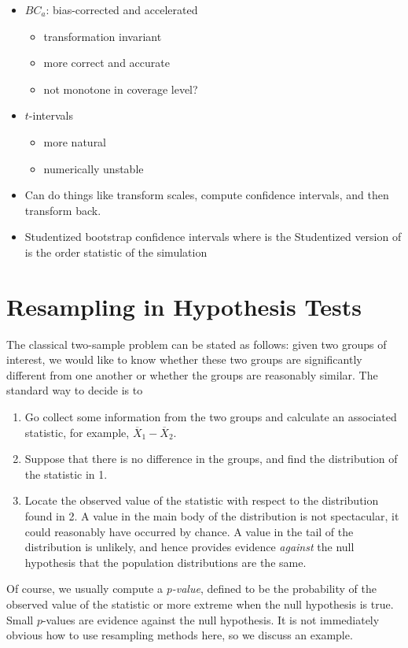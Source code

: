 \documentclass[captions=tableheading]{scrbook}
\begin{document}
\begin{itemize}
\item \(BC_{a}\): bias-corrected and accelerated
\begin{itemize}
\item transformation invariant
\item more correct and accurate
\item not monotone in coverage level?
\end{itemize}
\item \(t\)-intervals
\begin{itemize}
\item more natural
\item numerically unstable
\end{itemize}
\item Can do things like transform scales, compute confidence intervals, and then transform back.
\item Studentized bootstrap confidence intervals where is the Studentized version of is the  order statistic of the simulation
\end{itemize}
\section{Resampling in Hypothesis Tests}
\label{sec-13-4}
\label{sec-Resampling-in-Hypothesis}


The classical two-sample problem can be stated as follows: given two groups of interest, we would like to know whether these two groups are significantly different from one another or whether the groups are reasonably similar. The standard way to decide is to 
\begin{enumerate}
\item Go collect some information from the two groups and calculate an associated statistic, for example, \(\overline{X}_{1}-\overline{X}_{2}\).
\item Suppose that there is no difference in the groups, and find the distribution of the statistic in 1.
\item Locate the observed value of the statistic with respect to the distribution found in 2. A value in the main body of the distribution is not spectacular, it could reasonably have occurred by chance. A value in the tail of the distribution is unlikely, and hence provides evidence \emph{against} the null hypothesis that the population distributions are the same.
\end{enumerate}

Of course, we usually compute a \emph{p-value}, defined to be the probability of the observed value of the statistic or more extreme when the null hypothesis is true. Small \(p\)-values are evidence against the null hypothesis. It is not immediately obvious how to use resampling methods here, so we discuss an example.
\end{document}
